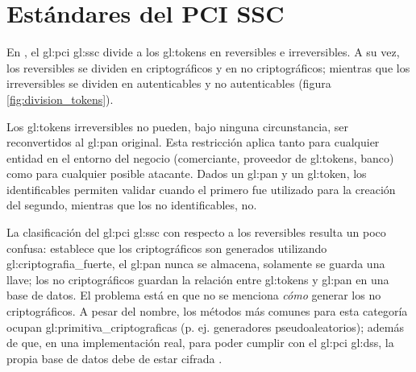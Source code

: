 %
%

\section{Estándares del PCI SSC}
\label{sec:pci_dss}

En \cite{pci_tokens}, el \gls{gl:pci} \gls{gl:ssc} divide a los
\glspl{gl:token} en reversibles e irreversibles. A su vez, los reversibles se
dividen en criptográficos y en no criptográficos; mientras que los
irreversibles se dividen en autenticables y no autenticables (figura
\ref{fig:division_tokens}).

Los \glspl{gl:token} irreversibles no pueden, bajo ninguna circunstancia, ser
reconvertidos al \gls{gl:pan} original. Esta restricción aplica tanto para
cualquier entidad en el entorno del negocio (comerciante, proveedor de
\glspl{gl:token}, banco) como para cualquier posible atacante. Dados un
\gls{gl:pan} y un \gls{gl:token}, los identificables permiten validar cuando el
primero fue utilizado para la creación del segundo, mientras que los no
identificables, no.



La clasificación del \gls{gl:pci} \gls{gl:ssc} con respecto a los reversibles
resulta un poco confusa: establece que los criptográficos son generados
utilizando \gls{gl:criptografia_fuerte}, el \gls{gl:pan} nunca se almacena,
solamente se guarda una llave; los no criptográficos guardan la relación entre
\glspl{gl:token} y \gls{gl:pan} en una base de datos. El problema está en que
no se menciona \textit{cómo} generar los no criptográficos. A pesar del nombre,
los métodos más comunes para esta categoría ocupan
\glspl{gl:primitiva_criptografica} (p. ej. generadores pseudoaleatorios);
además de que, en una implementación real, para poder cumplir con el
\gls{gl:pci} \gls{gl:dss}, la propia base de datos debe de estar cifrada
\cite{pci_dss}.

